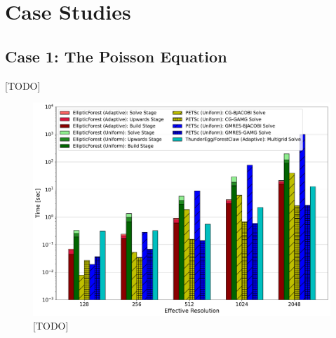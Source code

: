 \section{Case Studies}
\label{sec:case-studies}

\subsection{Case 1: The Poisson Equation}

[TODO]

\begin{landscape}
    \begin{figure}
        \centering
        \includegraphics[width=1.0\textwidth, clip=true, trim={0 0 0 0}]{figures/case01-stacked-bar-plot-comparisons-no-title.pdf}
        \caption{[TODO]}
        \label{fig:case01-stacked-bar-plot}
    \end{figure}
\end{landscape}

